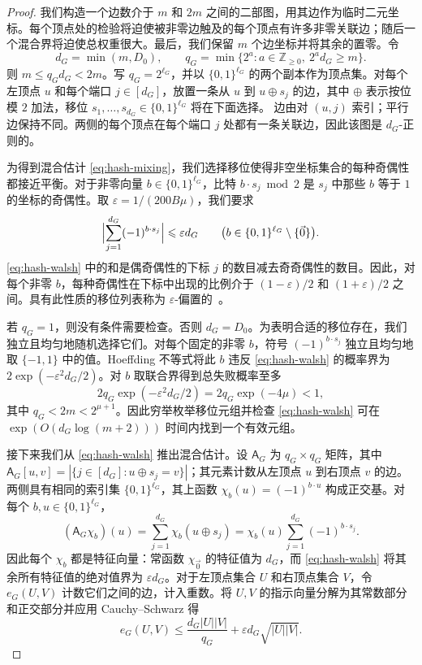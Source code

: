 \documentclass[11pt,reqno]{amsart}
\numberwithin{equation}{section}
\theoremstyle{definition}\newtheorem{definition}[theorem]{定义}
\theoremstyle{remark}\newtheorem{remark}[theorem]{注}
\renewcommand{\le}{\leqslant}
\renewcommand{\ge}{\geqslant}
\begin{document}
\begin{proof}
我们构造一个边数介于 $m$ 和 $2m$ 之间的二部图，用其边作为临时二元坐标。每个顶点处的检验将迫使被非零边触及的每个顶点有许多非零关联边；随后一个混合界将迫使总权重很大。最后，我们保留 $m$ 个边坐标并将其余的置零。令
\[
 d_G=\min(m,D_0),
 \qquad
 q_G=\min\{2^a:a\in\mathbb Z_{\ge0},\ 2^a d_G\ge m\}.
\]
则 $m\le q_Gd_G<2m$。写 $q_G=2^{\ell_G}$，并以 $\{0,1\}^{\ell_G}$ 的两个副本作为顶点集。对每个左顶点 $u$ 和每个端口 $j\in[d_G]$，放置一条从 $u$ 到 $u\oplus s_j$ 的边，其中 $\oplus$ 表示按位模 $2$ 加法，移位 $s_1,\ldots,s_{d_G}\in\{0,1\}^{\ell_G}$ 将在下面选择。
边由对 $(u,j)$ 索引；平行边保持不同。两侧的每个顶点在每个端口 $j$ 处都有一条关联边，因此该图是 $d_G$-正则的。

为得到混合估计 \eqref{eq:hash-mixing}，我们选择移位使得非空坐标集合的每种奇偶性都接近平衡。对于非零向量
$b\in\{0,1\}^{\ell_G}$，比特 $b\cdot s_j\bmod2$ 是 $s_j$ 中那些 $b$ 等于 $1$ 的坐标的奇偶性。取 $\varepsilon=1/(200B\mu)$，我们要求
\begin{equation}\label{eq:hash-walsh}
 \Bigl|\sum_{j=1}^{d_G}(-1)^{b\cdot s_j}\Bigr|
 \le\varepsilon d_G
 \qquad
 \bigl(b\in\{0,1\}^{\ell_G}\setminus\{\vec{0}\}\bigr).
\end{equation}
\eqref{eq:hash-walsh} 中的和是偶奇偶性的下标 $j$ 的数目减去奇奇偶性的数目。因此，对每个非零 $b$，每种奇偶性在下标中出现的比例介于 $(1-\varepsilon)/2$ 和 $(1+\varepsilon)/2$ 之间。具有此性质的移位列表称为 $\varepsilon$-偏置的~\cite[定义~2.1--2.2]{NN93}。

若 $q_G=1$，则没有条件需要检查。否则 $d_G=D_0$。为表明合适的移位存在，我们独立且均匀地随机选择它们。对每个固定的非零 $b$，符号 $(-1)^{b\cdot s_j}$ 独立且均匀地取 $\{-1,1\}$ 中的值。Hoeffding 不等式将此 $b$ 违反 \eqref{eq:hash-walsh} 的概率界为 $2\exp(-\varepsilon^2d_G/2)$。对 $b$ 取联合界得到总失败概率至多
\[
 2q_G\exp(-\varepsilon^2d_G/2)
 =2q_G\exp(-4\mu)<1,
\]
其中 $q_G<2m<2^{\mu+1}$。因此穷举枚举移位元组并检查 \eqref{eq:hash-walsh} 可在 $\exp(O(d_G\log(m+2)))$ 时间内找到一个有效元组。

接下来我们从 \eqref{eq:hash-walsh} 推出混合估计。设 $\mathsf A_G$ 为 $q_G\times q_G$ 矩阵，其中 $\mathsf A_G[u,v]=|\{j\in[d_G]:u\oplus s_j=v\}|$；其元素计数从左顶点 $u$ 到右顶点 $v$ 的边。两侧具有相同的索引集 $\{0,1\}^{\ell_G}$，其上函数 $\chi_b(u)=(-1)^{b\cdot u}$ 构成正交基。对每个 $b,u\in\{0,1\}^{\ell_G}$，
\[
 (\mathsf A_G\chi_b)(u)
 =\sum_{j=1}^{d_G}\chi_b(u\oplus s_j)
 =\chi_b(u)\sum_{j=1}^{d_G}(-1)^{b\cdot s_j}.
\]
因此每个 $\chi_b$ 都是特征向量：常函数 $\chi_{\vec{0}}$ 的特征值为 $d_G$，而 \eqref{eq:hash-walsh} 将其余所有特征值的绝对值界为 $\varepsilon d_G$。对于左顶点集合 $U$ 和右顶点集合 $V$，令 $e_G(U,V)$ 计数它们之间的边，计入重数。将 $U,V$ 的指示向量分解为其常数部分和正交部分并应用 Cauchy--Schwarz 得
\begin{equation}\label{eq:hash-mixing}
 e_G(U,V)\le
 \frac{d_G|U||V|}{q_G}
 +\varepsilon d_G\sqrt{|U||V|}.
\end{equation}


\end{proof}
\end{document}
